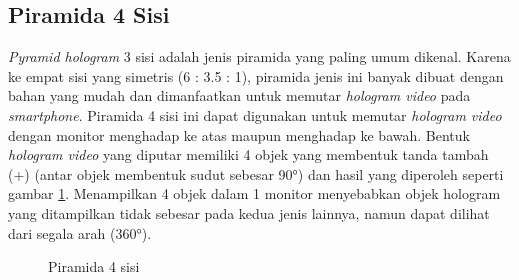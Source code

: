 	\subsection{Piramida 4 Sisi}
	\vspace{1ex}
	\textit{Pyramid hologram} 3 sisi adalah jenis piramida yang paling umum dikenal. Karena ke empat sisi yang simetris (6 : 3.5 : 1), piramida jenis ini banyak dibuat dengan bahan yang mudah dan dimanfaatkan untuk memutar \textit{hologram video} pada \textit{smartphone}\cite{tutorialpiramid}. Piramida 4 sisi ini dapat digunakan untuk memutar \textit{hologram video} dengan monitor menghadap ke atas maupun menghadap ke bawah.	Bentuk \textit{hologram video} yang diputar memiliki 4 objek yang membentuk tanda tambah (+) (antar objek membentuk sudut sebesar 90°) dan hasil yang diperoleh seperti gambar \ref{fig:piramid4}. Menampilkan 4 objek dalam 1 monitor menyebabkan objek hologram yang ditampilkan tidak sebesar pada kedua jenis lainnya, namun dapat dilihat dari segala arah (360°).
	\begin{figure} [H]
		\hspace{0.1em}
		\caption{Piramida 4 sisi}
		\label{fig:piramid4}
	\end{figure}
	
\vspace{2ex}

